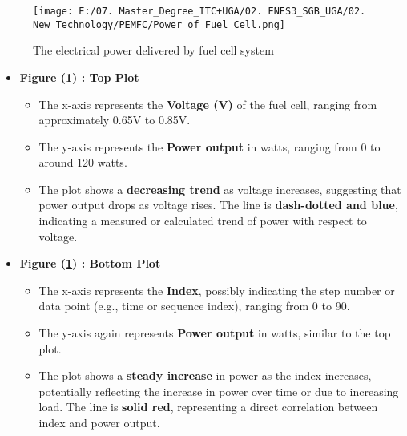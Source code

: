 \documentclass[12pt,a4paper]{article}
\numberwithin{equation}{section}
\begin{document}
{\begin{figure}[h]
	\centering 
	\texttt{[image: E:/07. Master\_Degree\_ITC+UGA/02. ENES3\_SGB\_UGA/02. New Technology/PEMFC/Power\_of\_Fuel\_Cell.png]}
	\caption{\small {The electrical power delivered by fuel cell system}}
	\label{16}
\end{figure}
\begin{itemize}
	\item \textbf{Figure (\ref{16}) : Top Plot}
	\begin{itemize}
		\item The x-axis represents the \textbf{Voltage (V)} of the fuel cell, ranging from approximately 0.65V to 0.85V.
		\item The y-axis represents the \textbf{Power output} in watts, ranging from 0 to around 120 watts.
		\item The plot shows a \textbf{decreasing trend} as voltage increases, suggesting that power output drops as voltage rises. The line is \textbf{dash-dotted and blue}, indicating a measured or calculated trend of power with respect to voltage.
	\end{itemize}
	
	\item \textbf{Figure (\ref{16}) : Bottom Plot}
	\begin{itemize}
		\item The x-axis represents the \textbf{Index}, possibly indicating the step number or data point (e.g., time or sequence index), ranging from 0 to 90.
		\item The y-axis again represents \textbf{Power output} in watts, similar to the top plot.
		\item The plot shows a \textbf{steady increase} in power as the index increases, potentially reflecting the increase in power over time or due to increasing load. The line is \textbf{solid red}, representing a direct correlation between index and power output.
	\end{itemize}
\end{itemize}





}
\end{document}
